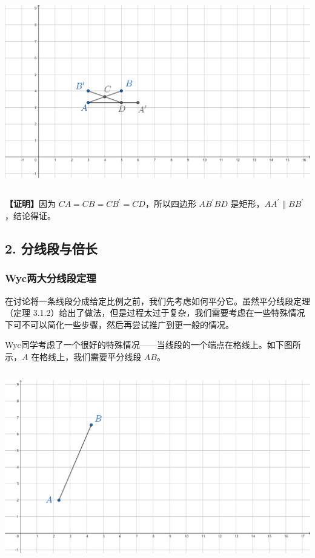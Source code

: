 \documentclass[UTF8]{article}
\begin{document}
\includegraphics[width=5.76806in,height=3.27847in]{media/image16.png}

\textbf{【证明】}因为 \(CA = CB = CB^{'} = CD\)，所以四边形 \(AB^{'}BD\)
是矩形，\(AA^{'} \parallel BB^{'}\)，结论得证。

\subsection{2.
分线段与倍长}

\hypertarget{wycux4e24ux5927ux5206ux7ebfux6bb5ux5b9aux7406}{%
\subsubsection{Wyc两大分线段定理}\label{wycux4e24ux5927ux5206ux7ebfux6bb5ux5b9aux7406}}

在讨论将一条线段分成给定比例之前，我们先考虑如何平分它。虽然平分线段定理（定理
3.1.2）给出了做法，但是过程太过于复杂，我们需要考虑在一些特殊情况下可不可以简化一些步骤，然后再尝试推广到更一般的情况。

Wyc同学考虑了一个很好的特殊情况------当线段的一个端点在格线上。如下图所示，\(A\)
在格线上，我们需要平分线段 \(AB\)。

\includegraphics[width=5.76806in,height=3.27847in]{media/image17.png}
\end{document}
